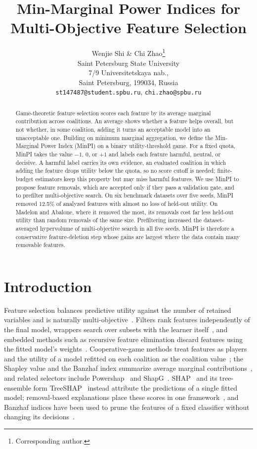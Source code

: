 \documentclass{article}
\title{Min-Marginal Power Indices for \\ Multi-Objective Feature Selection}
\author{Wenjie Shi \& Chi Zhao\thanks{Corresponding author.} \\
Saint Petersburg State University \\
7/9 Universitetskaya nab., \\
Saint Petersburg, 199034, Russia \\
\texttt{st147487@student.spbu.ru}, \texttt{chi.zhao@spbu.ru}}
\begin{document}
\maketitle
\lhead{}
\renewcommand{\headrulewidth}{0pt}

\begin{abstract}

Game-theoretic feature selection scores each feature by its average marginal contribution across coalitions. An average shows whether a feature helps overall, but not whether, in some coalition, adding it turns an acceptable model into an unacceptable one. Building on minimum marginal aggregation, we define the Min-Marginal Power Index (MinPI) on a binary utility-threshold game. For a fixed quota, MinPI takes the value $-1$, $0$, or $+1$ and labels each feature harmful, neutral, or decisive. A harmful label carries its own evidence, an evaluated coalition in which adding the feature drops utility below the quota, so no score cutoff is needed; finite-budget estimators keep this property but may miss harmful features. We use MinPI to propose feature removals, which are accepted only if they pass a validation gate, and to prefilter multi-objective search. On six benchmark datasets over five seeds, MinPI removed 12.5\% of analyzed features with almost no loss of held-out utility. On Madelon and Abalone, where it removed the most, its removals cost far less held-out utility than random removals of the same size. Prefiltering increased the dataset-averaged hypervolume of multi-objective search in all five seeds. MinPI is therefore a conservative feature-deletion step whose gains are largest where the data contain many removable features.
\end{abstract}

\section{Introduction}
\label{sec:intro}

Feature selection balances predictive utility against the number of retained variables and is naturally multi-objective~\citep{guyon2003introduction,chandrashekar2014survey,xue2016survey}. Filters rank features independently of the final model, wrappers search over subsets with the learner itself~\citep{kohavi1997wrappers}, and embedded methods such as recursive feature elimination discard features using the fitted model's weights~\citep{guyon2002gene}. Cooperative-game methods treat features as players and the utility of a model refitted on each coalition as the coalition value~\citep{cohen2007feature}; the Shapley value and the Banzhaf index summarize average marginal contributions~\citep{shapley1953value,banzhaf1965weighted}, and related selectors include Powershap~\citep{verhaeghe2022powershap} and ShapG~\citep{zhao2025shapg}. SHAP~\citep{lundberg2017unified} and its tree-ensemble form TreeSHAP~\citep{lundberg2020local} instead attribute the predictions of a single fitted model; removal-based explanations place these scores in one framework~\citep{covert2021explaining}, and Banzhaf indices have been used to prune the features of a fixed classifier without changing its decisions~\citep{kulynych2017feature}.
\end{document}
